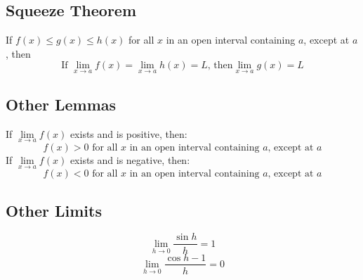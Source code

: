\documentclass[../ma2002_notes.tex]{subfiles}
\begin{document}
\subsection{Squeeze Theorem}
If \(f(x)\leq g(x)\leq h(x)\) for all \(x\) in an open interval containing \(a\), except at \(a\), then
\[\text{If }\lim_{x\to a}f(x)=\lim_{x\to a}h(x)=L\text{, then} \lim_{x\to a}g(x)=L\]

\subsection{Other Lemmas}
If \(\lim \limits_{x \to a} f(x)\) exists and is positive, then:
\[f(x)>0 \text{ for all } x \text{ in an open interval containing } a \text{, except at } a\]
If \(\lim \limits_{x \to a} f(x)\) exists and is negative, then:
\[f(x)<0 \text{ for all } x \text{ in an open interval containing } a \text{, except at } a\]

\subsection{Other Limits}
\[\lim \limits_{h \to 0} \frac{\sin h}{h} = 1\]
\[\lim \limits_{h \to 0} \frac{\cos h - 1}{h} = 0\]
\end{document}
